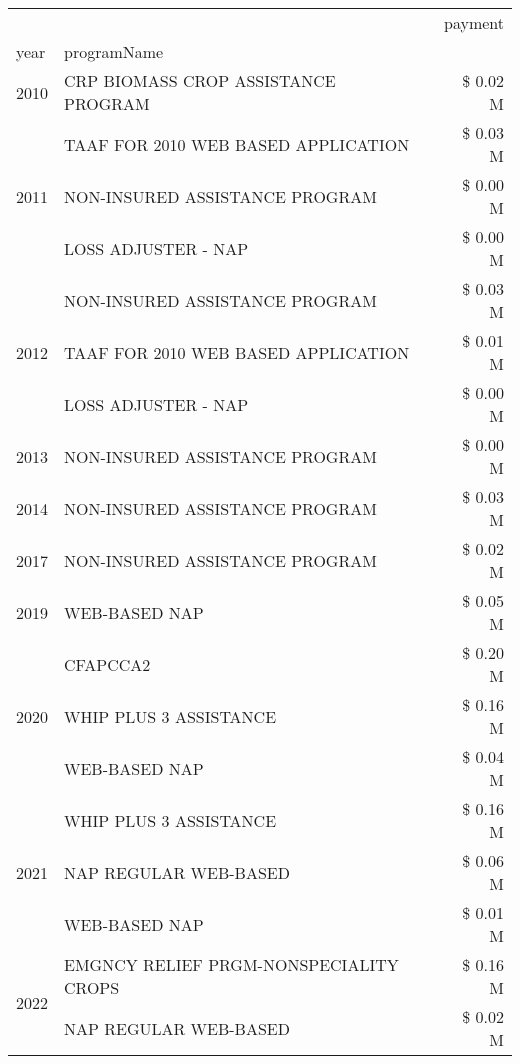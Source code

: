\begin{tabular}{llr}
\toprule
 &  & payment \\
year & programName &  \\
\midrule
2010 & CRP BIOMASS CROP ASSISTANCE PROGRAM & \$ 0.02 M \\
\cline{1-3}
\multirow[t]{3}{*}{2011} & TAAF FOR 2010 WEB BASED APPLICATION & \$ 0.03 M \\
 & NON-INSURED ASSISTANCE PROGRAM & \$ 0.00 M \\
 & LOSS ADJUSTER - NAP & \$ 0.00 M \\
\cline{1-3}
\multirow[t]{3}{*}{2012} & NON-INSURED ASSISTANCE PROGRAM & \$ 0.03 M \\
 & TAAF FOR 2010 WEB BASED APPLICATION & \$ 0.01 M \\
 & LOSS ADJUSTER - NAP & \$ 0.00 M \\
\cline{1-3}
2013 & NON-INSURED ASSISTANCE PROGRAM & \$ 0.00 M \\
\cline{1-3}
2014 & NON-INSURED ASSISTANCE PROGRAM & \$ 0.03 M \\
\cline{1-3}
2017 & NON-INSURED ASSISTANCE PROGRAM & \$ 0.02 M \\
\cline{1-3}
2019 & WEB-BASED NAP & \$ 0.05 M \\
\cline{1-3}
\multirow[t]{3}{*}{2020} & CFAPCCA2 & \$ 0.20 M \\
 & WHIP PLUS 3 ASSISTANCE & \$ 0.16 M \\
 & WEB-BASED NAP & \$ 0.04 M \\
\cline{1-3}
\multirow[t]{3}{*}{2021} & WHIP PLUS 3 ASSISTANCE & \$ 0.16 M \\
 & NAP REGULAR WEB-BASED & \$ 0.06 M \\
 & WEB-BASED NAP & \$ 0.01 M \\
\cline{1-3}
\multirow[t]{2}{*}{2022} & EMGNCY RELIEF PRGM-NONSPECIALITY CROPS & \$ 0.16 M \\
 & NAP REGULAR WEB-BASED & \$ 0.02 M \\
\cline{1-3}
\bottomrule
\end{tabular}
